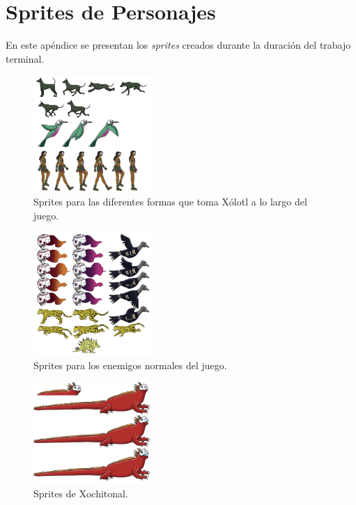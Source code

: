 \chapter{Sprites de Personajes} \label{Anexo:Personajes}
En este apéndice se presentan los \textit{sprites} creados durante la duración
del trabajo terminal.

\begin{figure}[H]
    \centering
    \includegraphics[width=0.40\textwidth]{Anexos/disenios/Xolotl.png}
    \caption{Sprites para las diferentes formas que toma Xólotl a lo largo del juego.}
    \label{fig:Xolotl}
\end{figure}

\begin{figure}[H]
    \centering
    \includegraphics[width=0.40\textwidth]{Anexos/disenios/EnemigosNormales.png}
    \caption{Sprites para los enemigos normales del juego.}
    \label{fig:NorlmalEnemy}
\end{figure}

\begin{figure}[H]
    \centering
    \includegraphics[width=0.40\textwidth]{Anexos/disenios/Xochitonal.png}
    \caption{Sprites de Xochitonal.}
    \label{fig:Xochitonal}
\end{figure}

